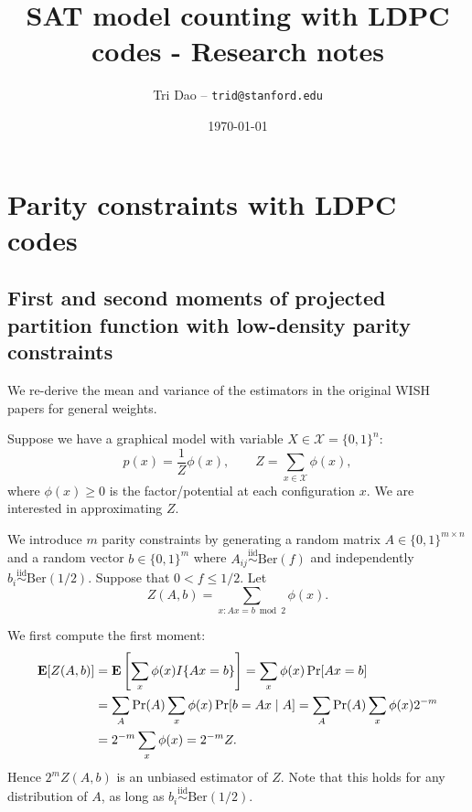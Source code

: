 \documentclass[11pt]{article}
\title{SAT model counting with LDPC codes - Research notes}
\author{Tri Dao -- \texttt{trid@stanford.edu}}
\date{\today}
\begin{document}
\maketitle

\section{Parity constraints with LDPC codes}
\label{sec:parity_constraints}

\subsection{First and second moments of projected partition function with
  low-density parity constraints}
\label{subsec:first_second_moments}

We re-derive the mean and variance of the estimators in the original WISH papers
\cite{wishicml13,ermon2014low} for general weights.

Suppose we have a graphical model with variable $X \in \mathcal{X} = \{
0, 1 \}^n$:
\begin{equation*}
  p(x) = \frac{1}{Z} \phi(x), \qquad
  Z = \sum_{x \in \mathcal{X}} \phi(x),
\end{equation*}
where $\phi(x) \geq 0$ is the factor/potential at each configuration $x$.
We are interested in approximating $Z$.

We introduce $m$ parity constraints by generating a random matrix $A \in \{ 0, 1
\}^{m \times n}$ and a random vector $b \in \{ 0, 1 \}^m$ where $A_{ij}
\overset{\text{iid}}{\sim} \mathrm{Ber}(f)$ and independently $b_i
\overset{\text{iid}}{\sim} \mathrm{Ber}(1/2)$.
Suppose that $0 < f \leq 1/2$.
Let
\begin{equation*}
  Z(A, b) = \sum_{x \colon Ax = b \bmod 2} \phi(x).
\end{equation*}

We first compute the first moment:
\begin{align*}
  \operatorname{\mathbf{E}}[Z(A, b)]
  &= \operatorname{\mathbf{E}}\left[\sum_{x} \phi(x) I \{ Ax = b \}\right] = \sum_{x} \phi(x) \Pr[Ax =
    b] \\
  &= \sum_{A} \Pr(A) \sum_{x} \phi(x) \Pr[b = Ax \mid A] = \sum_{A} \Pr(A)
    \sum_{x} \phi(x) 2^{-m} \\
  &= 2^{-m} \sum_{x} \phi(x) = 2^{-m} Z.
\end{align*}
Hence $2^m Z(A, b)$ is an unbiased estimator of $Z$.
Note that this holds for any distribution of $A$, as long as $b_i
\overset{\text{iid}}{\sim} \mathrm{Ber}(1/2)$.
\end{document}
